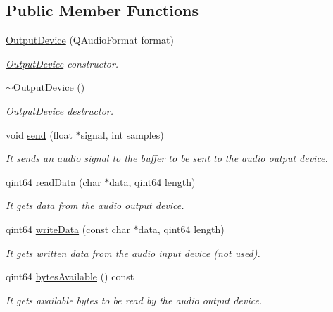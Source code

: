 \subsection*{Public Member Functions}
\begin{DoxyCompactItemize}
\item 
\hyperlink{class_output_device_aa1e4dbe8403fb3fc022f71e3e3c26ee7}{Output\+Device} (Q\+Audio\+Format format)
\begin{DoxyCompactList}\small\item\em \hyperlink{class_output_device}{Output\+Device} constructor. \end{DoxyCompactList}\item 
\mbox{\label{class_output_device_a10111574a055eee12fb86934f049a6b4}} 
\hyperlink{class_output_device_a10111574a055eee12fb86934f049a6b4}{$\sim$\+Output\+Device} ()
\begin{DoxyCompactList}\small\item\em \hyperlink{class_output_device}{Output\+Device} destructor. \end{DoxyCompactList}\item 
void \hyperlink{class_output_device_aa4906f742ed51716dfc9a7602014efcc}{send} (float $\ast$signal, int samples)
\begin{DoxyCompactList}\small\item\em It sends an audio signal to the buffer to be sent to the audio output device. \end{DoxyCompactList}\item 
qint64 \hyperlink{class_output_device_a5f455a9fdaa26664957b54b7806a1b7d}{read\+Data} (char $\ast$data, qint64 length)
\begin{DoxyCompactList}\small\item\em It gets data from the audio output device. \end{DoxyCompactList}\item 
qint64 \hyperlink{class_output_device_ab616ad1f0080ce753b511c08360bdde8}{write\+Data} (const char $\ast$data, qint64 length)
\begin{DoxyCompactList}\small\item\em It gets written data from the audio input device (not used). \end{DoxyCompactList}\item 
qint64 \hyperlink{class_output_device_ae15675354b4b09ca3ff02a24be102c4d}{bytes\+Available} () const
\begin{DoxyCompactList}\small\item\em It gets available bytes to be read by the audio output device. \end{DoxyCompactList}\item 

\end{DoxyCompactItemize}
